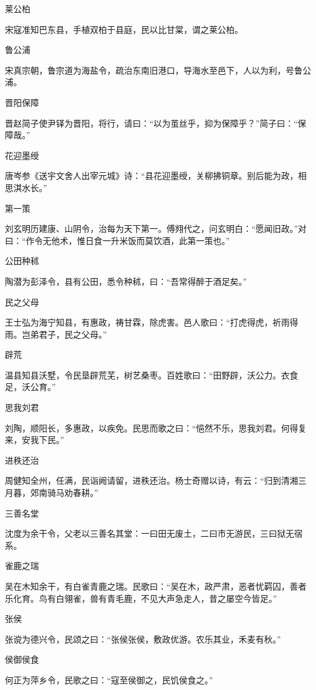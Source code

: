 \documentclass[a4paper,12pt,UTF8,twoside]{ctexbook}
\begin{document}
    莱公柏
    
    宋寇准知巴东县，手植双柏于县庭，民以比甘棠，谓之莱公柏。
    
    鲁公浦
    
    宋真宗朝，鲁宗道为海盐令，疏治东南旧港口，导海水至邑下，人以为利，号鲁公浦。
    
    晋阳保障
    
    晋赵简子使尹铎为晋阳，将行，请曰：“以为茧丝乎，抑为保障乎？”简子曰：“保障哉。”
    
    花迎墨绶
    
    唐岑参《送宇文舍人出宰元城》诗：“县花迎墨绶，关柳拂铜章。别后能为政，相思淇水长。”
    
    第一策
    
    刘玄明历建康、山阴令，治每为天下第一。傅翙代之，问玄明白：“愿闻旧政。”对曰：“作令无他术，惟日食一升米饭而莫饮酒，此第一策也。”
    
    公田种秫
    
    陶潜为彭泽令，县有公田，悉令种秫，曰：“吾常得醉于酒足矣。”
    
    民之父母
    
    王士弘为海宁知县，有惠政，祷甘霖，除虎害。邑人歌曰：“打虎得虎，祈雨得雨。岂弟君子，民之父母。”
    
    辟荒
    
    温县知县沃墅，令民垦辟荒芜，树艺桑枣。百姓歌曰：“田野辟，沃公力。衣食足，沃公育。”
    
    思我刘君
    
    刘陶，顺阳长，多惠政，以疾免。民思而歌之曰：“悒然不乐，思我刘君。何得复来，安我下民。”
    
    进秩还治
    
    周健知全州，任满，民诣阙请留，进秩还治。杨士奇赠以诗，有云：“归到清湘三月暮，郊南骑马劝春耕。”
    
    三善名堂
    
    沈度为余干令，父老以三善名其堂：一曰田无废土，二曰市无游民，三曰狱无宿系。
    
    雀鹿之瑞
    
    吴在木知余干，有白雀青鹿之瑞。民歌曰：“吴在木，政严肃，恶者忧羁囚，善者乐化育。鸟有白翎雀，兽有青毛鹿，不见大声急走人，昔之屡空今皆足。”
    
    张侯
    
    张谠为德兴令，民颂之曰：“张侯张侯，敷政优游。农乐其业，禾麦有秋。”
    
    侯御侯食
    
    何正为萍乡令，民歌之曰：“寇至侯御之，民饥侯食之。”
    
\end{document}
